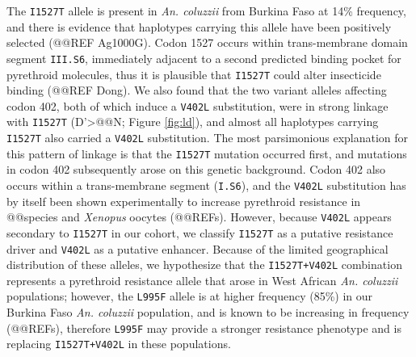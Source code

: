 \documentclass[a4paper,11pt,abstracton]{scrartcl}
\begin{document}
%
The \texttt{I1527T} allele is present in \textit{An. coluzzii} from Burkina Faso at 14\% frequency, and there is evidence that haplotypes carrying this allele have been positively selected (@@REF Ag1000G).
%
Codon 1527 occurs within trans-membrane domain segment \texttt{III.S6}, immediately adjacent to a second predicted binding pocket for pyrethroid molecules, thus it is plausible that \texttt{I1527T} could alter insecticide binding (@@REF Dong).
%
We also found that the two variant alleles affecting codon 402, both of which induce a \texttt{V402L} substitution, were in strong linkage with \texttt{I1527T} (D'>@@N; Figure \ref{fig:ld}), and almost all haplotypes carrying \texttt{I1527T} also carried a \texttt{V402L} substitution.
%
The most parsimonious explanation for this pattern of linkage is that the \texttt{I1527T} mutation occurred first, and mutations in codon 402 subsequently arose on this genetic background.
%
Codon 402 also occurs within a trans-membrane segment (\texttt{I.S6}), and the \texttt{V402L} substitution has by itself been shown experimentally to increase pyrethroid resistance in @@species and \textit{Xenopus} oocytes (@@REFs).
%
However, because \texttt{V402L} appears secondary to \texttt{I1527T} in our cohort, we classify \texttt{I1527T} as a putative resistance driver and \texttt{V402L} as a putative enhancer.
%
Because of the limited geographical distribution of these alleles, we hypothesize that the \texttt{I1527T+V402L} combination represents a pyrethroid resistance allele that arose in West African \textit{An. coluzzii} populations; however, the \texttt{L995F} allele is at higher frequency (85\%) in our Burkina Faso \textit{An. coluzzii} population, and is known to be increasing in frequency (@@REFs), therefore \texttt{L995F} may provide a stronger resistance phenotype and is replacing \texttt{I1527T+V402L} in these populations.
\end{document}
